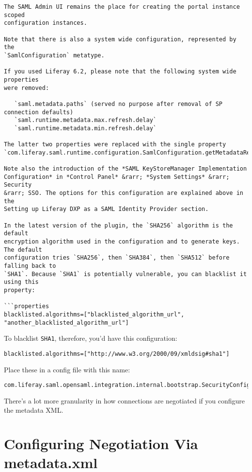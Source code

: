 \begin{verbatim}
The SAML Admin UI remains the place for creating the portal instance scoped
configuration instances.

Note that there is also a system wide configuration, represented by the
`SamlConfiguration` metatype. 

If you used Liferay 6.2, please note that the following system wide properties
were removed:

   `saml.metadata.paths` (served no purpose after removal of SP connection defaults)
   `saml.runtime.metadata.max.refresh.delay`
   `saml.runtime.metadata.min.refresh.delay`

The latter two properties were replaced with the single property
`com.liferay.saml.runtime.configuration.SamlConfiguration.getMetadataRefreshInterval()`.

Note also the introduction of the *SAML KeyStoreManager Implementation
Configuration* in *Control Panel* &rarr; *System Settings* &rarr; Security
&rarr; SSO. The options for this configuration are explained above in the
Setting up Liferay DXP as a SAML Identity Provider section.

In the latest version of the plugin, the `SHA256` algorithm is the default
encryption algorithm used in the configuration and to generate keys. The default
configuration tries `SHA256`, then `SHA384`, then `SHA512` before falling back to
`SHA1`. Because `SHA1` is potentially vulnerable, you can blacklist it using this
property: 

```properties
blacklisted.algorithms=["blacklisted_algorithm_url", "another_blacklisted_algorithm_url"]
\end{verbatim}

To blacklist \texttt{SHA1}, therefore, you'd have this configuration:

\begin{verbatim}
blacklisted.algorithms=["http://www.w3.org/2000/09/xmldsig#sha1"]
\end{verbatim}

Place these in a config file with this name:

\begin{verbatim}
com.liferay.saml.opensaml.integration.internal.bootstrap.SecurityConfigurationBootstrap.config
\end{verbatim}

There's a lot more granularity in how connections are negotiated if you
configure the metadata XML.

\section{Configuring Negotiation Via
metadata.xml}\label{configuring-negotiation-via-metadata.xml}

